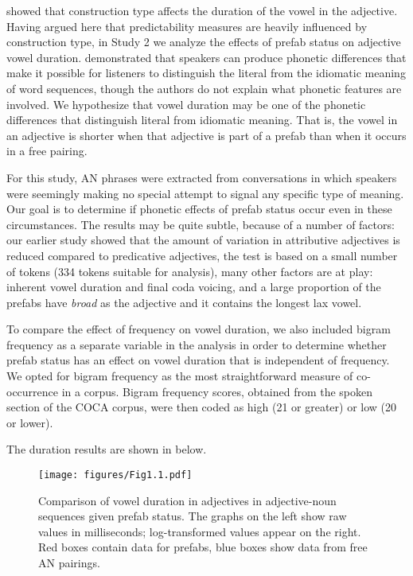 \documentclass[output=paper]{langscibook}
\begin{document}
\citet{BybeeSouza2019} showed that construction type affects the duration of the vowel in the adjective. Having argued here that predictability measures are heavily influenced by construction type, in Study 2 we analyze the effects of prefab status on adjective vowel duration.  \citet{VanLanckerCanter1981} demonstrated that speakers can produce phonetic differences that make it possible for listeners to distinguish the literal from the idiomatic meaning of word sequences, though the authors do not explain what phonetic features are involved. We hypothesize that vowel duration may be one of the phonetic differences that distinguish literal from idiomatic meaning. That is, the vowel in an adjective is shorter when that adjective is part of a prefab than when it occurs in a free pairing. 

For this study, AN phrases were extracted from conversations in which speakers were seemingly making no special attempt to signal any specific type of meaning. Our goal is to determine if phonetic effects of prefab status occur even in these circumstances. The results may be quite subtle, because of a number of factors:  our earlier study showed that the amount of variation in attributive adjectives is reduced compared to predicative adjectives,  the test is based on a small number of tokens (334 tokens suitable for analysis),  many other factors are at play: inherent vowel duration and final coda voicing, and  a large proportion of the prefabs have \textit{broad} as the adjective and it contains the longest lax vowel.

To compare the effect of frequency on vowel duration, we also included bigram frequency as a separate variable in the analysis in order to determine whether prefab status has an effect on vowel duration that is independent of frequency. We opted for bigram frequency as the most straightforward measure of co-occur\-rence in a corpus. Bigram frequency scores, obtained from the spoken section of the COCA corpus, were then coded as high (21 or greater) or low (20 or lower).

The duration results are shown in  below.

\begin{figure}
\texttt{[image: figures/Fig1.1.pdf]}
\caption{\label{fig:bybee:1}Comparison of vowel duration in adjectives in adjective-noun sequences given prefab status. The graphs on the left show raw values in milliseconds; log-transformed values appear on the right. Red boxes contain data for prefabs, blue boxes show data from free AN pairings.}
\end{figure}
\end{document}
